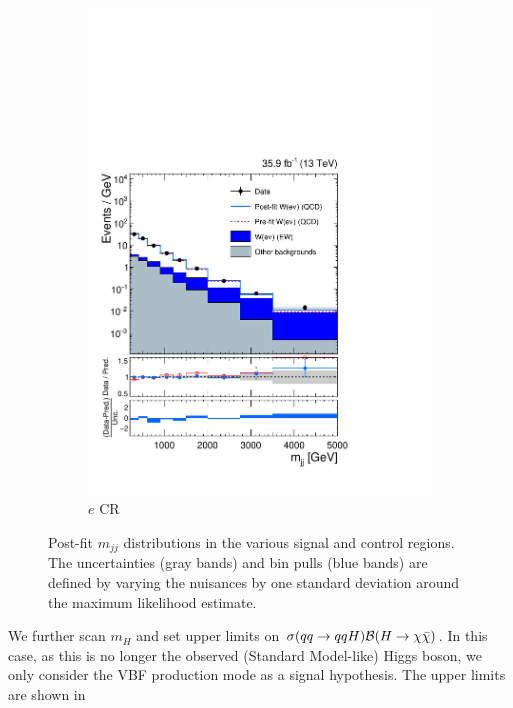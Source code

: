\begin{figure}[]
\begin{center}
\begin{subfigure}[t]{0.32\textwidth}
            \includegraphics[width=\textwidth]{figures/vbf/fits/vbf_PULLS_prefit_postfit_singleelectron.pdf}
            \caption{$e$ CR}
        \end{subfigure}
        \caption{Post-fit $m_{jj}$ distributions in the various signal and control regions.
                 The uncertainties (gray bands) and bin pulls (blue bands) are defined by varying the nuisances by one standard deviation around the maximum likelihood estimate.}
        \label{fig:vbf:postfit}
    \end{center}
\end{figure}

We further scan $m_H$ and set upper limits on $\sigma(qq\rightarrow qqH)\mathcal{B}(H\rightarrow\chi\bar\chi)$. 
In this case, as this is no longer the observed (Standard Model-like) Higgs boson, we only consider the VBF production mode as a signal hypothesis. 
The upper limits are shown in

